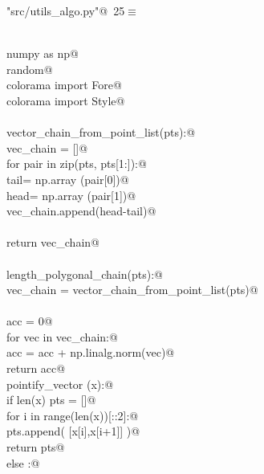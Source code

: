 \documentclass[10pt, english, oneside]{report}
\begin{document}
\begin{appendices}
\begin{flushleft} \small\label{scrap24}\raggedright\small
{} \verb@"src/utils_algo.py"@\nobreak\ {\footnotesize {25}}$\equiv$
\vspace{-1ex}
\begin{list}{}{} \item
\mbox{}\verb@@\\
\mbox{}\verb@import numpy as np@\\
\mbox{}\verb@import random@\\
\mbox{}\verb@from colorama import Fore@\\
\mbox{}\verb@from colorama import Style@\\
\mbox{}\verb@@\\
\mbox{}\verb@def vector_chain_from_point_list(pts):@\\
\mbox{}\verb@    vec_chain = []@\\
\mbox{}\verb@    for pair in zip(pts, pts[1:]):@\\
\mbox{}\verb@        tail= np.array (pair[0])@\\
\mbox{}\verb@        head= np.array (pair[1])@\\
\mbox{}\verb@        vec_chain.append(head-tail)@\\
\mbox{}\verb@@\\
\mbox{}\verb@    return vec_chain@\\
\mbox{}\verb@@\\
\mbox{}\verb@def length_polygonal_chain(pts):@\\
\mbox{}\verb@    vec_chain = vector_chain_from_point_list(pts)@\\
\mbox{}\verb@@\\
\mbox{}\verb@    acc = 0@\\
\mbox{}\verb@    for vec in vec_chain:@\\
\mbox{}\verb@        acc = acc + np.linalg.norm(vec)@\\
\mbox{}\verb@    return acc@\\
\mbox{}\verb@def pointify_vector (x):@\\
\mbox{}\verb@    if len(x) % 2 == 0:@\\
\mbox{}\verb@        pts = []@\\
\mbox{}\verb@        for i in range(len(x))[::2]:@\\
\mbox{}\verb@            pts.append( [x[i],x[i+1]] )@\\
\mbox{}\verb@        return pts@\\
\mbox{}\verb@    else :@\\

\end{list}
\end{flushleft}
\end{appendices}
\end{document}
